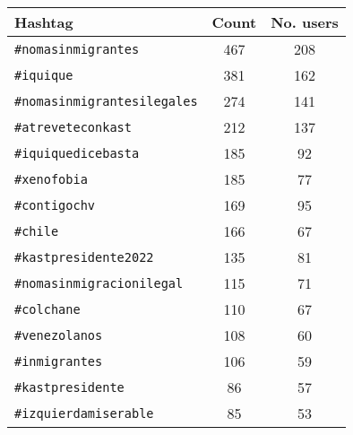 %
    
    \begin{tabular}{lcc}
        \toprule\toprule
        Hashtag & Count & No. users\\ \midrule
        \texttt{\#nomasinmigrantes} & 467 & 208 \\ 
        \texttt{\#iquique} & 381 & 162 \\ 
        \texttt{\#nomasinmigrantesilegales} &  274 & 141 \\ 
        \texttt{\#atreveteconkast} &  212 & 137 \\
        \texttt{\#iquiquedicebasta} & 185 & 92 \\ 
        \texttt{\#xenofobia} & 185 & 77 \\ 
        \texttt{\#contigochv} & 169 & 95 \\ 
        \texttt{\#chile} & 166 & 67 \\
        \texttt{\#kastpresidente2022} & 135 & 81 \\ 
        \texttt{\#nomasinmigracionilegal} & 115 & 71 \\
        \texttt{\#colchane} & 110 & 67 \\ 
        \texttt{\#venezolanos} & 108 & 60 \\ 
        \texttt{\#inmigrantes} & 106 & 59 \\
        \texttt{\#kastpresidente} & 86 & 57 \\
        \texttt{\#izquierdamiserable} & 85 & 53 \\
        \bottomrule\bottomrule
    \end{tabular}

%